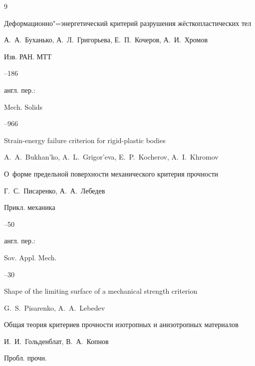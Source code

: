 \begin{thebibliography}{9}

\paper Деформационно"=энергетический критерий разрушения жёсткопластических тел 

\by А.~А.~Буханько, А.~Л.~Григорьева, Е.~П.~Кочеров, А.~И.~Хромов 

\jour Изв. РАН. МТТ 



--186

\transl англ. пер.:~

\jour Mech. Solids




--966

\paper Strain-energy failure criterion for rigid-plastic bodies

\by  A.~A.~Bukhan'ko, A.~L.~Grigor'eva, E.~P.~Kocherov, A.~I.~Khromov 






\paper О~форме предельной поверхности механического критерия прочности

\by Г.~С.~Писаренко, А.~А.~Лебедев

\jour Прикл. механика




--50

\transl англ. пер.:~

\jour Sov. Appl. Mech.




--30

\paper Shape of the limiting surface of a mechanical strength criterion

\by G.~S.~Pisarenko, A.~A.~Lebedev 








\paper Общая теория критериев прочности изотропных и анизотропных материалов

\by И.~И.~Гольденблат, В.~А.~Копнов

\jour Пробл. прочн.


\end{thebibliography}

